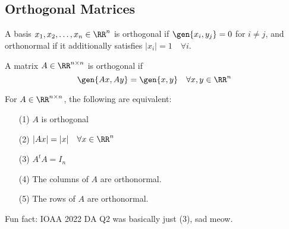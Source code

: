 \subsection{Orthogonal Matrices}

\begin{definition}

A basis $x_1, x_2, \hdots, x_n\in \RR^n$ is \ac{orthogonal} if $\gen{x_i, y_j} = 0$ for $i\neq j$, and \ac{orthonormal} if it additionally satisfies $\vert x_i\vert = 1\quad \forall i$. 
\end{definition}

\begin{definition}

A matrix $A\in \RR^{n\times n}$ is \ac{orthogonal} if 
\[\gen{Ax, Ay} = \gen{x,y}\quad \forall x,y\in \RR^n\]
\end{definition}

\begin{theorem}
\thmlabel

For $A\in \RR^{n\times n}$, the following are equivalent: 
\begin{itemize}
    \item [(1)] $A$ is orthogonal
    \item [(2)] $\vert Ax\vert = \vert x\vert\quad \forall x\in \RR^n$ 
    \item [(3)] $A^tA = I_n$
    \item [(4)] The columns of $A$ are orthonormal. 
    \item [(5)] The rows of $A$ are orthonormal. 
\end{itemize}
\end{theorem}

Fun fact: IOAA 2022 DA Q2 was basically just (3), sad meow. 

